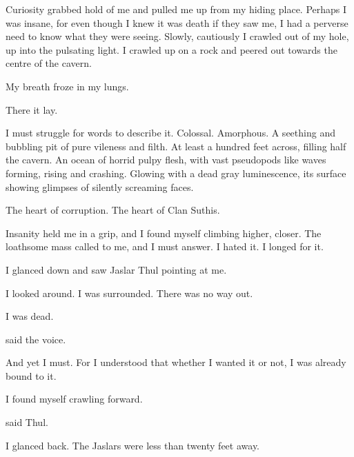 \documentclass
  [a4paper,
   12pt,
   oneside
  ]%
  {article}
\begin{document}
Curiosity grabbed hold of me and pulled me up from my hiding place. 
Perhaps I was insane, for even though I knew it was death if they saw me, I had a perverse need to know what they were seeing. 
Slowly, cautiously I crawled out of my hole, up into the pulsating light. 
I crawled up on a rock and peered out towards the centre of the cavern.

My breath froze in my lungs. 

There it lay. 

I must struggle for words to describe it. 
Colossal. 
Amorphous. 
A seething and bubbling pit of pure vileness and filth. 
At least a hundred feet across, filling half the cavern. 
An ocean of horrid pulpy flesh, with vast pseudopods like waves forming, rising and crashing. 
Glowing with a dead gray luminescence, its surface showing glimpses of silently screaming faces. 

The heart of corruption. 
The heart of Clan Suthis. 


Insanity held me in a grip, and I found myself climbing higher, closer. 
The loathsome mass called to me, and I must answer.
I hated it. 
I longed for it. 


I glanced down and saw Jaslar Thul pointing at me.


I looked around. 
I was surrounded. 
There was no way out.

I was dead. 

 said the voice.

And yet I must. 
For I understood that whether I wanted it or not, I was already bound to it. 

I found myself crawling forward.

 said Thul.


I glanced back.
The Jaslars were less than twenty feet away. 
\end{document}
